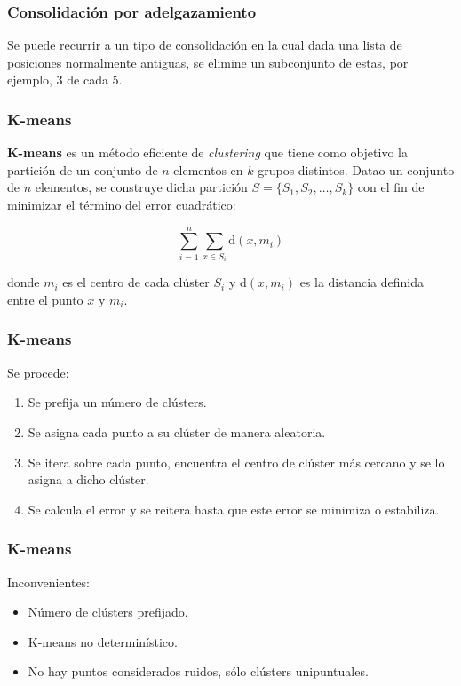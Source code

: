 \documentclass[10pt, spanish]{beamer}
\begin{document}
\begin{frame}[fragile]
\frametitle{Consolidaci\'on por adelgazamiento}
Se puede recurrir a un tipo de consolidaci\'on en la cual dada una lista de posiciones normalmente antiguas, se elimine un subconjunto de estas, por ejemplo, 3 de cada 5.\\
\bigskip
\begin{algorithmic}[1]
			\EndFor
		\EndIf
	\EndFor
\EndFunction
\end{algorithmic}
\end{frame}

\begin{frame}[fragile]
\frametitle{K-means}
\textbf{K-means} es un m\'etodo eficiente de \textit{clustering} que tiene como objetivo la partici\'on de un conjunto de $n$ elementos en $k$ grupos distintos. Datao un conjunto de $n$ elementos, se construye dicha partici\'on $S=\{S_1, S_2, \ldots, S_k\}$ con el fin de minimizar el t\'ermino del error cuadr\'atico:

$$ \sum_{i=1}^{n} \sum_{x\in S_i} \text{d}(x,m_i)$$

donde $m_i$ es el centro de cada cl\'uster $S_i$ y $\text{d}(x, m_i)$ es la distancia definida entre el punto $x$ y $m_i$.

\end{frame}

\begin{frame}[fragile]
\frametitle{K-means}
Se procede:
\begin{enumerate}
	\item Se prefija un n\'umero de cl\'usters.
	\item Se asigna cada punto a su cl\'uster de manera aleatoria.
	\item Se itera sobre cada punto, encuentra el centro de cl\'uster m\'as cercano y se lo asigna a dicho cl\'uster.
	\item Se calcula el error y se reitera hasta que este error se minimiza o estabiliza.
\end{enumerate}
\end{frame}

\begin{frame}[fragile]
\frametitle{K-means}
Inconvenientes:
\begin{itemize}
	\item N\'umero de cl\'usters prefijado.
	\item K-means no determin\'istico.
	\item No hay puntos considerados ruidos, s\'olo cl\'usters unipuntuales.
\end{itemize}
\end{frame}
\end{document}
